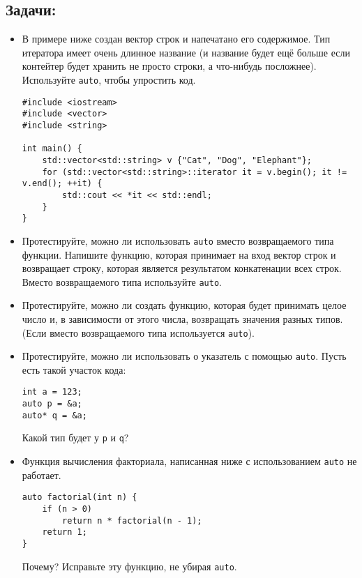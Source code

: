 \documentclass{article}
\begin{document}
\subsection*{Задачи:}
\begin{itemize}
\item В примере ниже создан вектор строк и напечатано его содержимое. Тип итератора имеет очень длинное название (и название будет ещё больше если контейтер будет хранить не просто строки, а что-нибудь посложнее). Используйте \texttt{auto}, чтобы упростить код.
\begin{lstlisting}
#include <iostream>
#include <vector>
#include <string>

int main() {
    std::vector<std::string> v {"Cat", "Dog", "Elephant"};
    for (std::vector<std::string>::iterator it = v.begin(); it != v.end(); ++it) {
    	std::cout << *it << std::endl;    
    }
}
\end{lstlisting}

\item Протестируйте, можно ли использовать \texttt{auto} вместо возвращаемого типа функции. Напишите функцию, которая принимает на вход вектор строк и возвращает строку, которая является результатом конкатенации всех строк. Вместо возвращаемого типа используйте \texttt{auto}.
\item Протестируйте, можно ли создать функцию, которая будет принимать целое число и, в зависимости от этого числа, возвращать значения разных типов. (Если вместо возвращаемого типа используется \texttt{auto}).

\item Протестируйте, можно ли использовать о указатель с помощью \texttt{auto}. Пусть есть такой участок кода:
\begin{lstlisting}
int a = 123;
auto p = &a;
auto* q = &a;
\end{lstlisting}
Какой тип будет у \texttt{p} и \texttt{q}?
\item Функция вычисления факториала, написанная ниже с использованием \texttt{auto} не работает. 
\begin{lstlisting}
auto factorial(int n) {
    if (n > 0)
        return n * factorial(n - 1);
    return 1;
}
\end{lstlisting}
Почему? Исправьте эту функцию, не убирая \texttt{auto}.

\end{itemize}


\newpage
\end{document}
